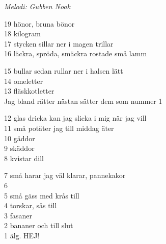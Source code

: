 {\footnotesize\textit{Melodi: Gubben Noak}}\par
\vspace{10pt}
19 hönor, bruna bönor\\
18 kilogram\\
17 stycken sillar ner i magen trillar\\
16 läckra, spröda, smäckra rostade små lamm\par
\vspace{10pt}
15 bullar sedan rullar ner i halsen lätt\\
14 omeletter\\
13 fläskkotletter\\
Jag bland rätter nästan sätter dem som nummer 1\par
\vspace{10pt}
12 glas dricka kan jag slicka i mig när jag vill\\
11 små potäter jag till middag äter\\
10 gäddor\\
9 skäddor\\
8 kvistar dill\par
\vspace{10pt}
7 små harar jag väl klarar, pannekakor\\
6\\
5 små gäss med krås till\\
4 torskar, sås till\\
3 fasaner\\
2 bananer och till slut\\
1 älg. HEJ!

